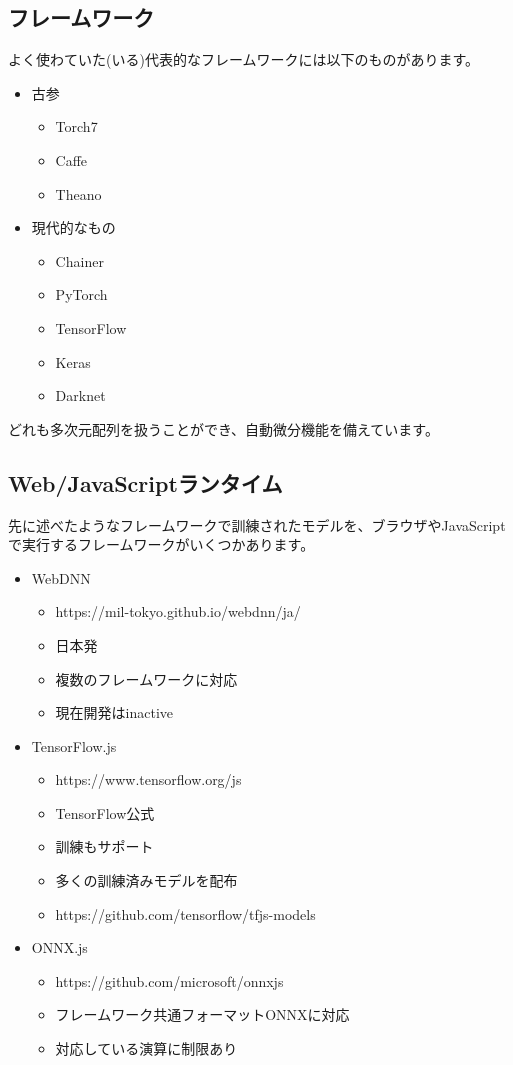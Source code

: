 \documentclass[mingoth,a4paper]{jsarticle}
\begin{document}
\subsection{フレームワーク}

よく使わていた(いる)代表的なフレームワークには以下のものがあります。

\begin{itemize}
\item 古参
  \begin{itemize}
  \item Torch7
  \item Caffe
  \item Theano
  \end{itemize}
\item 現代的なもの
  \begin{itemize}
  \item Chainer
  \item PyTorch
  \item TensorFlow
  \item Keras
  \item Darknet
  \end{itemize}
\end{itemize}

どれも多次元配列を扱うことができ、自動微分機能を備えています。

\subsection{Web/JavaScriptランタイム}

先に述べたようなフレームワークで訓練されたモデルを、ブラウザやJavaScriptで実行するフレームワークがいくつかあります。

\begin{itemize}
\item WebDNN
  \begin{itemize}
  \item https://mil-tokyo.github.io/webdnn/ja/
  \item 日本発
  \item 複数のフレームワークに対応
  \item 現在開発はinactive
  \end{itemize}
\item TensorFlow.js
  \begin{itemize}
  \item https://www.tensorflow.org/js
  \item TensorFlow公式
  \item 訓練もサポート
  \item 多くの訓練済みモデルを配布
  \item https://github.com/tensorflow/tfjs-models
  \end{itemize}
\item ONNX.js
  \begin{itemize}
  \item https://github.com/microsoft/onnxjs
  \item フレームワーク共通フォーマットONNXに対応
  \item 対応している演算に制限あり
  \end{itemize}
\end{itemize}
\end{document}
